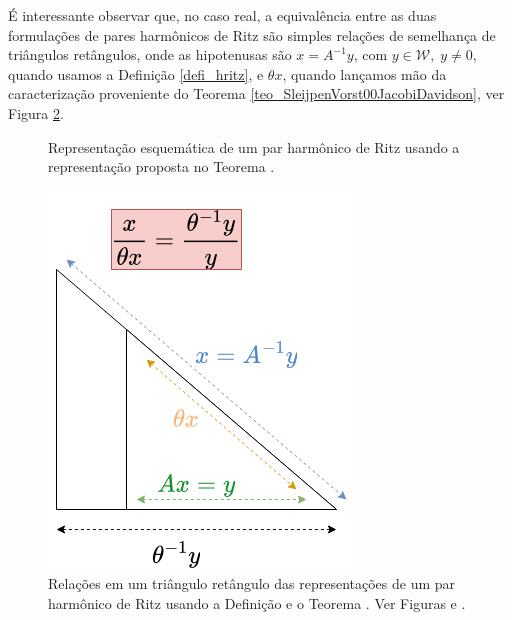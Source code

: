 \'{E} interessante observar que, no caso real, a equivalência entre as duas formulaç\~{o}es de pares harmônicos de Ritz são simples relaç\~{o}es de semelhança de triângulos retângulos, onde as hipotenusas são $x=A^{-1}y$, com $y \in\mathcal{W},\;y\ne0$,  quando usamos a Definição \ref{defi_hritz}, e $\theta x$, quando lançamos mão da caracterização proveniente do Teorema \ref{teo_SleijpenVorst00JacobiDavidson}, ver Figura \ref{fig_hritzpairtriang}.
\begin{figure}[htb]
  \caption{Representação esquemática de um par harmônico de Ritz usando a representação proposta no Teorema \protect{\ref{teo_SleijpenVorst00JacobiDavidson}}.}\label{fig_hritzpair}
\end{figure}

\begin{figure}[htb]
  \begin{center}
  \includegraphics[scale=.7]{triangret.png}
  \caption{ Relações em um triângulo retângulo das representações de um par harmônico de Ritz usando a Definição \protect{\ref{defi_hritz}} e o Teorema \protect{\ref{teo_SleijpenVorst00JacobiDavidson}}. Ver Figuras \protect{\ref{fig_hritzpairorig}} e \protect{\ref{fig_hritzpair}}.}\label{fig_hritzpairtriang}
  \end{center}

\end{figure}
